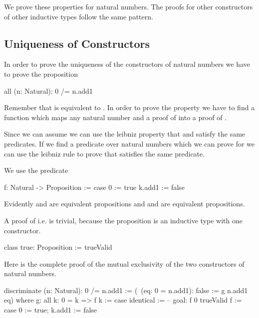 We prove these properties for natural numbers. The proofs for other constructors
of other inductive types follow the same pattern.




\subsection{Uniqueness of Constructors}

In order to prove the uniqueness of the constructors of natural numbers we have
to prove the proposition

\begin{alba}
    all (n: Natural): 0 /= n.add1
\end{alba}

Remember that  is equivalent to . In order to prove the property we have to find a function which
maps any natural number  and a proof of  into a
proof of .

Since we can assume  we can use the leibniz property that
 and  satisfy the same predicates. If we find a
predicate over natural numbers which we can prove for  we can use the
leibniz rule to prove that  satisfies the same predicate.

We use the predicate
\begin{alba}
    f: Natural -> Proposition :=
        case
            0 :=
                true
            k.add1 :=
                false
\end{alba}

Evidently  and  are equivalent propositions and  and  are equivalent propositions.

A proof of  i.e.  is trivial, because the proposition
 is an inductive type with one constructor.

\begin{alba}
    class true: Proposition := trueValid
\end{alba}


Here is the complete proof of the mutual exclusivity of the two constructors of
natural numbers.


\begin{alba}
    discriminate (n: Natural): 0 /= n.add1
    :=
        (\ (eq: 0 = n.add1): false := g n.add1 eq)
        where
            g: all k: 0 = k => f k :=
                case
                    identical :=
                        -- goal: f 0
                        trueValid
            f :=
                case 0 := true; k.add1 := false
\end{alba}


